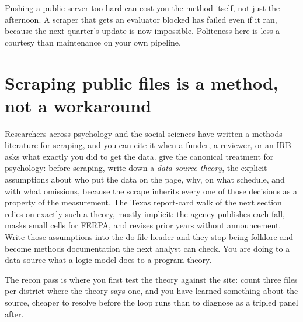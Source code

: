 \documentclass[
    a4paper,
    fontsize=10pt,
    twoside=true,
    numbers=noenddot,
]{kaobook}
\begin{document}
Pushing a public server too hard can cost you the method itself, not just the afternoon. A scraper that gets an evaluator blocked has failed even if it ran, because the next quarter's update is now impossible. Politeness here is less a courtesy than maintenance on your own pipeline.

\section{Scraping public files is a method, not a workaround}\label{sec:ch04-scrapelit}
Researchers across psychology and the social sciences have written a methods literature for scraping, and you can cite it when a funder, a reviewer, or an IRB asks what exactly you did to get the data. \textcite{landers2016scraping} give the canonical treatment for psychology: before scraping, write down a \emph{data source theory}, the explicit assumptions about who put the data on the page, why, on what schedule, and with what omissions, because the scrape inherits every one of those decisions as a property of the measurement. The Texas report-card walk of the next section relies on exactly such a theory, mostly implicit: the agency publishes each fall, masks small cells for FERPA, and revises prior years without announcement. Write those assumptions into the do-file header and they stop being folklore and become methods documentation the next analyst can check. You are doing to a data source what a logic model does to a program theory.

The recon pass is where you first test the theory against the site: count three files per district where the theory says one, and you have learned something about the source, cheaper to resolve before the loop runs than to diagnose as a tripled panel after.
\end{document}

